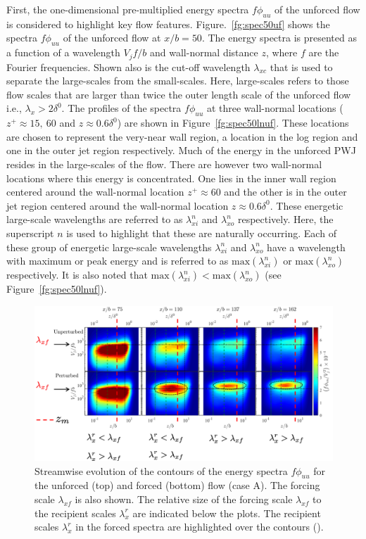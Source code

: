 First, the one-dimensional pre-multiplied energy spectra  $f\phi_{uu}$ of the unforced flow is considered to highlight key flow features. Figure.~\ref{fg:spec50uf} shows the spectra $f\phi_{uu}$ of the unforced flow at $x/b=50$. The energy spectra is presented as a function of a wavelength $V_j f/b$ and wall-normal distance $z$, where $f$ are the Fourier frequencies. Shown also is the cut-off wavelength $\lambda_{xc}$ that is used to separate the large-scales from the small-scales. Here, large-scales refers to those flow scales that are larger than twice the outer length scale of the unforced flow i.e., $\lambda_x> 2\delta^0$. The profiles of the spectra $f\phi_{uu}$ at three wall-normal locations ($z^+\approx 15,~60$ and $z\approx 0.6\delta^0$) are shown in Figure~\ref{fg:spec50lnuf}. These locations are chosen to represent the very-near wall region, a location in the log region and one in the outer jet region respectively. Much of the energy in the unforced PWJ resides in the large-scales of the flow. There are however two wall-normal locations where this energy is concentrated. One lies in the inner wall region centered around the wall-normal location $z^+\approx 60$ and the other is in the outer jet region centered around the wall-normal location $z\approx 0.6\delta^0$. These energetic large-scale wavelengths are referred to as $\lambda_{xi}^n$ and $\lambda_{xo}^n$ respectively. Here, the superscript $n$ is used to highlight that these are naturally occurring. Each of these group of energetic large-scale wavelengths $\lambda_{xi}^n$ and $\lambda_{xo}^n$ have a wavelength with maximum or peak energy and is referred to as $\textrm{max}\left(\lambda_{xi}^n\right)$ or $\textrm{max}\left(\lambda_{xo}^n\right)$ respectively. It is also noted that $\textrm{max}\left(\lambda_{xi}^n\right) < \textrm{max}\left(\lambda_{xo}^n\right)$ (see Figure~\ref{fg:spec50lnuf}).



\begin{figure}[h!]
	\centering
	\includegraphics[width=.99\textwidth]{pics/specEvol.png}
	\caption{Streamwise evolution of the contours of the energy spectra $f\phi_{uu}$ for the unforced (top) and forced (bottom) flow (case A). The forcing scale $\lambda_{xf}$ is also shown. The relative size of the forcing scale $\lambda_{xf}$ to the recipient scales $\lambda_x^r$ are indicated below the plots. The recipient scales $\lambda_x^r$ in the forced spectra are highlighted over the contours (\dashed).}
	\label{fg:specEvol}
\end{figure}

